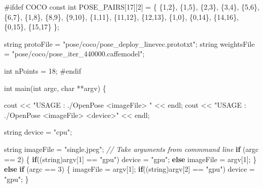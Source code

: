 \documentclass[
  12pt,
  a4paper,
]{article}
\newenvironment{Shaded}{}{}
\newcommand{\AttributeTok}[1]{\textcolor[rgb]{0.49,0.56,0.16}{#1}}
\newcommand{\CommentTok}[1]{\textcolor[rgb]{0.38,0.63,0.69}{\textit{#1}}}
\newcommand{\ControlFlowTok}[1]{\textcolor[rgb]{0.00,0.44,0.13}{\textbf{#1}}}
\newcommand{\DataTypeTok}[1]{\textcolor[rgb]{0.56,0.13,0.00}{#1}}
\newcommand{\DecValTok}[1]{\textcolor[rgb]{0.25,0.63,0.44}{#1}}
\newcommand{\NormalTok}[1]{#1}
\newcommand{\PreprocessorTok}[1]{\textcolor[rgb]{0.74,0.48,0.00}{#1}}
\newcommand{\StringTok}[1]{\textcolor[rgb]{0.25,0.44,0.63}{#1}}
\begin{document}
\begin{Shaded}
\begin{Highlighting}[numbers=left,,]
\PreprocessorTok{\#ifdef COCO}
\AttributeTok{const} \DataTypeTok{int}\NormalTok{ POSE\_PAIRS[}\DecValTok{17}\NormalTok{][}\DecValTok{2}\NormalTok{] = }
\NormalTok{\{   }
\NormalTok{    \{}\DecValTok{1}\NormalTok{,}\DecValTok{2}\NormalTok{\}, \{}\DecValTok{1}\NormalTok{,}\DecValTok{5}\NormalTok{\}, \{}\DecValTok{2}\NormalTok{,}\DecValTok{3}\NormalTok{\},}
\NormalTok{    \{}\DecValTok{3}\NormalTok{,}\DecValTok{4}\NormalTok{\}, \{}\DecValTok{5}\NormalTok{,}\DecValTok{6}\NormalTok{\}, \{}\DecValTok{6}\NormalTok{,}\DecValTok{7}\NormalTok{\},}
\NormalTok{    \{}\DecValTok{1}\NormalTok{,}\DecValTok{8}\NormalTok{\}, \{}\DecValTok{8}\NormalTok{,}\DecValTok{9}\NormalTok{\}, \{}\DecValTok{9}\NormalTok{,}\DecValTok{10}\NormalTok{\},}
\NormalTok{    \{}\DecValTok{1}\NormalTok{,}\DecValTok{11}\NormalTok{\}, \{}\DecValTok{11}\NormalTok{,}\DecValTok{12}\NormalTok{\}, \{}\DecValTok{12}\NormalTok{,}\DecValTok{13}\NormalTok{\},}
\NormalTok{    \{}\DecValTok{1}\NormalTok{,}\DecValTok{0}\NormalTok{\}, \{}\DecValTok{0}\NormalTok{,}\DecValTok{14}\NormalTok{\},}
\NormalTok{    \{}\DecValTok{14}\NormalTok{,}\DecValTok{16}\NormalTok{\}, \{}\DecValTok{0}\NormalTok{,}\DecValTok{15}\NormalTok{\}, \{}\DecValTok{15}\NormalTok{,}\DecValTok{17}\NormalTok{\}}
\NormalTok{\};}

\NormalTok{string protoFile = }\StringTok{"pose/coco/pose\_deploy\_linevec.prototxt"}\NormalTok{;}
\NormalTok{string weightsFile = }\StringTok{"pose/coco/pose\_iter\_440000.caffemodel"}\NormalTok{;}

\DataTypeTok{int}\NormalTok{ nPoints = }\DecValTok{18}\NormalTok{;}
\PreprocessorTok{\#endif}

\DataTypeTok{int}\NormalTok{ main(}\DataTypeTok{int}\NormalTok{ argc, }\DataTypeTok{char}\NormalTok{ **argv)}
\NormalTok{\{}

\NormalTok{    cout \textless{}\textless{} }\StringTok{"USAGE : ./OpenPose \textless{}imageFile\textgreater{} "}\NormalTok{ \textless{}\textless{} endl;}
\NormalTok{    cout \textless{}\textless{} }\StringTok{"USAGE : ./OpenPose \textless{}imageFile\textgreater{} \textless{}device\textgreater{}"}\NormalTok{ \textless{}\textless{} endl;}
    
\NormalTok{    string device = }\StringTok{"cpu"}\NormalTok{;}

\NormalTok{    string imageFile = }\StringTok{"single.jpeg"}\NormalTok{;}
    \CommentTok{// Take arguments from commmand line}
    \ControlFlowTok{if}\NormalTok{ (argc == }\DecValTok{2}\NormalTok{)}
\NormalTok{    \{   }
      \ControlFlowTok{if}\NormalTok{((string)argv[}\DecValTok{1}\NormalTok{] == }\StringTok{"gpu"}\NormalTok{)}
\NormalTok{        device = }\StringTok{"gpu"}\NormalTok{;}
      \ControlFlowTok{else} 
\NormalTok{      imageFile = argv[}\DecValTok{1}\NormalTok{];}
\NormalTok{    \}}
    \ControlFlowTok{else} \ControlFlowTok{if}\NormalTok{ (argc == }\DecValTok{3}\NormalTok{)}
\NormalTok{    \{}
\NormalTok{        imageFile = argv[}\DecValTok{1}\NormalTok{];}
        \ControlFlowTok{if}\NormalTok{((string)argv[}\DecValTok{2}\NormalTok{] == }\StringTok{"gpu"}\NormalTok{)}
\NormalTok{            device = }\StringTok{"gpu"}\NormalTok{;}
\NormalTok{    \}}




\end{Highlighting}
\end{Shaded}
\end{document}
